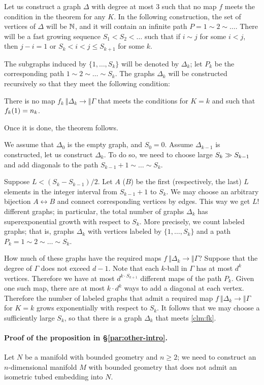 \documentclass[a4paper,10pt]{article}
\begin{document}
Let us construct a graph $\Delta$ with degree at most $3$ such that no map $f$ meets the condition in the theorem for any $K$.
In the following construction, the set of vertices of $\Delta$ will be $\mathbb{N}$, and it will contain an infinite path $P=1\sim 2\sim \dots$.
There will be a fast growing sequence $S_1<S_2<\dots$ such that 
if $i\sim j$ for some $i<j$, then $j-i=1$ or $S_k<i<j\le S_{k+1}$ for some $k$.

The subgraphs induced by $\{1,\dots, S_k\}$ will be denoted by $\Delta_k$;
let $P_k$ be the corresponding path $1\sim 2\sim \dots \sim S_k$.
The graphs $\Delta_k$ will be constructed recursively so that they meet the following condition:
\begin{clm}{}\label{clm:fk}
There is no map $f_k\:\Vert \Delta_k\to \Vert \Gamma$ that meets the conditions for $K=k$ and such that $f_k(1)\z=n_k$.
\end{clm}
Once it is done, the theorem follows. 

We assume that $\Delta_0$ is the empty graph, and $S_0=0$.
Assume $\Delta_{k-1}$ is constructed, let us  construct $\Delta_k$.
To do so, we need to choose large $S_k\z\gg S_{k-1}$ and add diagonals to the path $S_{k-1}+1\sim\dots\sim S_k$.

Suppose $L<(S_k-S_{k-1})/2$.
Let $A$ ($B$) be the first (respectively, the last) $L$ elements in the integer interval from $S_{k-1}+1$ to $S_k$.
We may choose an arbitrary bijection $A\leftrightarrow B$ and connect corresponding vertices by edges.
This way we get $L!$ different graphs; in particular, the total number of graphs $\Delta_k$ has superexponential growth with respect to $S_k$.
More precisely, we count labeled graphs; that is, graphs $\Delta_k$ with vertices labeled by $\{1,\dots,S_k\}$ and a path $P_k=1\sim 2\sim\dots\sim S_k$.

How much of these graphs have the required maps $f\:\Vert \Delta_k\to \Vert \Gamma$?
Suppose that the degree of $\Gamma$ does not exceed $d-1$.
Note that each $k$-ball in $\Gamma$ has at most $d^k$ vertices.
Therefore we have at most $d^{k\cdot S_{k+1}}$ different maps of the path $P_k$.
Given one such map, there are at most $k\cdot d^k$ ways to add a diagonal at each vertex.
Therefore the number of labeled graphs that admit a required map $f\:\Vert \Delta_k\to \Vert \Gamma$ for $K=k$ grows exponentially with respect to $S_k$.
It follows that we may choose a sufficiently large $S_k$,
so that there is a graph $\Delta_k$ that meets \ref{clm:fk}.
\qeds

\paragraph{Proof of the proposition in §\ref{par:other-intro}.}\label{par:other-proof}
Let $N$ be a manifold with bounded geometry and $n\ge 2$;
we need to construct an $n$-dimensional manifold $M$ with bounded geometry that does not admit an isometric tubed embedding into $N$.
\end{document}
